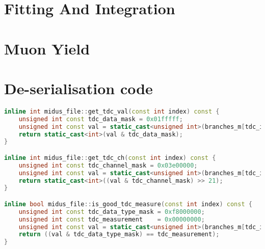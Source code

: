 \documentclass[]{article}
\begin{document}
\section{Fitting And Integration} %
\label{sec:fitting_and_integration}

\section{Muon Yield} %
\label{sec:muon_yield}

\appendix
\section{De-serialisation code} %
\label{app:deserialisation}

\begin{lstlisting}[caption={Functions used for de-serialising CAEN V1290N \ref{REF FOR THE DATA SHEET} MTDC  output, written in C++}, language=C++, float=htbp]
inline int midus_file::get_tdc_val(const int index) const {
    unsigned int const tdc_data_mask = 0x01fffff;
    unsigned int const val = static_cast<unsigned int>(branches_m[tdc_i].data[index]);
    return static_cast<int>(val & tdc_data_mask);
}

inline int midus_file::get_tdc_ch(const int index) const {
    unsigned int const tdc_channel_mask = 0x03e00000;
    unsigned int const val = static_cast<unsigned int>(branches_m[tdc_i].data[index]);
    return static_cast<int>((val & tdc_channel_mask) >> 21);
}

inline bool midus_file::is_good_tdc_measure(const int index) const {
    unsigned int const tdc_data_type_mask = 0xf8000000;
    unsigned int const tdc_measurement    = 0x00000000;
    unsigned int const val = static_cast<unsigned int>(branches_m[tdc_i].data[index]);
    return ((val & tdc_data_type_mask) == tdc_measurement);
}
\end{lstlisting}
\end{document}
